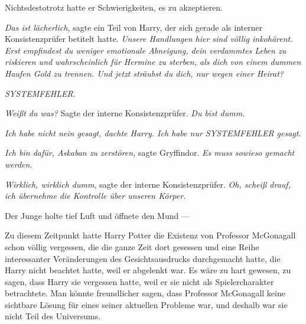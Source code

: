 Nichtsdestotrotz hatte er Schwierigkeiten, es zu akzeptieren.

\emph{Das ist lächerlich,} sagte ein Teil von Harry, der sich gerade als interner Konsistenzprüfer betitelt hatte. \emph{Unsere Handlungen hier sind völlig inkohärent. Erst empfindest du weniger emotionale Abneigung, dein verdammtes \emph{Leben} zu riskieren und wahrscheinlich für Hermine zu \emph{sterben}, als dich von einem dummen Haufen Gold zu trennen. Und jetzt sträubst du dich, nur wegen einer Heirat?}

\emph{SYSTEMFEHLER}.

\emph{Weißt du was?} Sagte der interne Konsistenzprüfer. \emph{Du bist dumm.}

\emph{Ich habe nicht nein gesagt, dachte Harry. Ich habe nur \emph{SYSTEMFEHLER} gesagt}.

\emph{Ich bin dafür, Askaban zu zerstören,} sagte Gryffindor. \emph{Es muss sowieso gemacht werden.}

\emph{Wirklich, wirklich dumm}, sagte der interne Konsistenzprüfer. \emph{Oh, scheiß drauf, ich übernehme die Kontrolle über unseren Körper.}

Der Junge holte tief Luft und öffnete den Mund —

Zu diesem Zeitpunkt hatte Harry Potter die Existenz von Professor McGonagall schon völlig vergessen, die die ganze Zeit dort gesessen und eine Reihe interessanter Veränderungen des Gesichtsausdrucks durchgemacht hatte, die Harry nicht beachtet hatte, weil er abgelenkt war. Es wäre zu hart gewesen, zu sagen, dass Harry sie vergessen hatte, weil er sie nicht als Spielercharakter betrachtete. Man könnte freundlicher sagen, dass Professor McGonagall keine sichtbare Lösung für eines seiner aktuellen Probleme war, und deshalb war sie nicht Teil des Universums.

